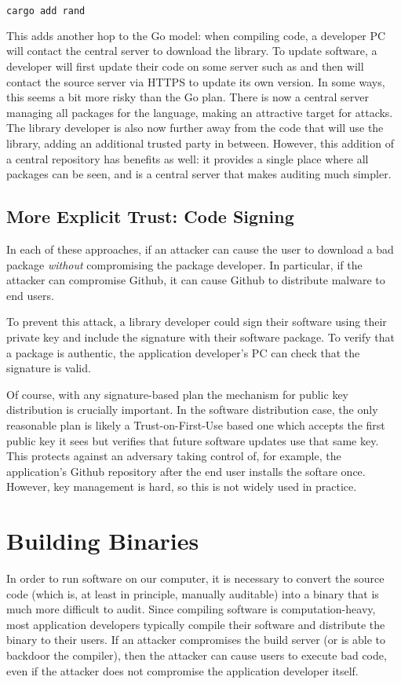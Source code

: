 \begin{lstlisting}[language=sh]
	cargo add rand
\end{lstlisting}

This adds another hop to the Go model: when compiling code, a developer PC will contact the central server  to download the library. To update software, a developer will first update their code on some server such as  and then  will contact the source server via HTTPS to update its own version. In some ways, this seems a bit more risky than the Go plan. There is now a central server managing all packages for the language, making an attractive target for attacks. The library developer is also now further away from the code that will use the library, adding an additional trusted party in between. However, this addition of a central repository has benefits as well: it provides a single place where all packages can be seen, and is a central server that makes auditing much simpler.
\fi

\subsection{More Explicit Trust: Code Signing}
In each of these approaches, if an attacker can cause the user to download
a bad package \emph{without} compromising the package developer.
In particular, if the attacker can compromise Github, it can 
cause Github to distribute malware to end users.

To prevent this attack, a library developer could
sign their software using their private key and
include the signature with their 
software package. To verify that a package is authentic,
the application developer's PC can check that the signature is
valid. 

Of course, with any signature-based plan the mechanism for public key distribution is crucially important. In the software distribution case, the only reasonable plan is likely a Trust-on-First-Use based one which accepts the first public key it sees but verifies that future software updates use that same key. This protects against an adversary taking control of, for example, the application's Github repository after the end user installs the softare once. However, key management is hard, so this is not widely used in practice.

\section{Building Binaries}
In order to run software on our computer, it is
necessary to convert the source code (which is, at
least in principle, manually auditable) into
a binary that is much more difficult to audit.
Since compiling software is computation-heavy,
most application developers typically 
compile their software and distribute the binary
to their users. 
If an attacker compromises the build server
(or is able to backdoor the compiler),
then the attacker can cause users to execute
bad code, even if the attacker does not compromise
the application developer itself.

